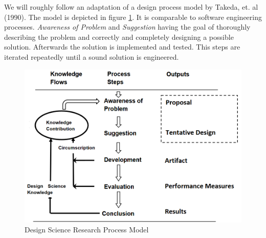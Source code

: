 \documentclass[10pt,a4paper,oneside]{scrartcl}
\begin{document}
	We will roughly follow an adaptation of a design process model by Takeda, et. al (1990). The model is depicted in figure \ref{fig:dsrModel}. It is comparable to software engineering processes. \textit{Awareness of Problem} and \textit{Suggestion} having the goal of thoroughly describing the problem and correctly and completely designing a possible solution. Afterwards the solution is implemented and tested. This steps are iterated repeatedly until a sound solution is engineered.
 	{
 		\begin{figure}
 			\centering
 			\includegraphics[scale=0.5]{./res/DSR_Model.png}
 			\caption{Design Science Research Process Model}
 			\label{fig:dsrModel}
 		\end{figure}
	}
	
\end{document}
